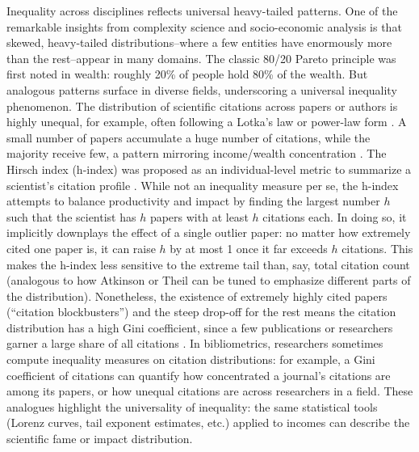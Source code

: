 \documentclass[11pt]{article}
\begin{document}
Inequality across disciplines reflects universal heavy-tailed patterns. One of the remarkable insights from complexity science and socio-economic analysis is that skewed, heavy-tailed distributions--where a few entities have enormously more than the rest--appear in many domains. The classic 80/20 Pareto principle \citep{blanchet2022generalized} was first noted in wealth: roughly 20\% of people hold 80\% of the wealth. But analogous patterns surface in diverse fields, underscoring a universal inequality phenomenon. The distribution of scientific citations across papers or authors is highly unequal, for example, often following a Lotka’s law or power-law form \citep{saam1999lotka}. A small number of papers accumulate a huge number of citations, while the majority receive few, a pattern mirroring income/wealth concentration \citep{aytac2025lotka}. The Hirsch index (h-index) was proposed as an individual-level metric to summarize a scientist’s citation profile \citep{bertoli2017theoretical}. While not an inequality measure per se, the h-index attempts to balance productivity and impact by finding the largest number $h$ such that the scientist has $h$ papers with at least $h$ citations each. In doing so, it implicitly downplays the effect of a single outlier paper: no matter how extremely cited one paper is, it can raise $h$ by at most 1 once it far exceeds $h$ citations. This makes the h-index less sensitive to the extreme tail than, say, total citation count (analogous to how Atkinson or Theil can be tuned to emphasize different parts of the distribution). Nonetheless, the existence of extremely highly cited papers (“citation blockbusters”) and the steep drop-off for the rest means the citation distribution has a high Gini coefficient, since  a few publications or researchers garner a large share of all citations \citep{bartneck2011detecting}. In bibliometrics, researchers sometimes compute inequality measures on citation distributions: for example, a Gini coefficient of citations can quantify how concentrated a journal’s citations are among its papers, or how unequal citations are across researchers in a field. These analogues highlight the universality of inequality: the same statistical tools (Lorenz curves, tail exponent estimates, etc.) applied to incomes can describe the scientific fame or impact distribution.
\end{document}

